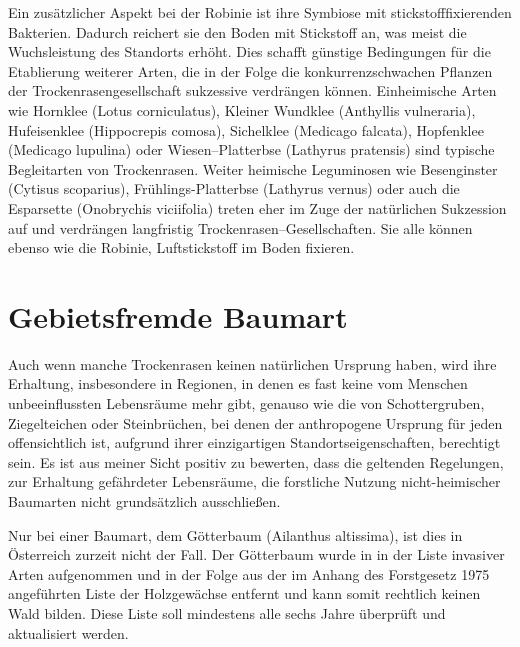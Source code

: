 \documentclass[twocolumn]{scrartcl}
\begin{document}
Ein zusätzlicher Aspekt bei der Robinie ist ihre Symbiose mit
stickstofffixierenden Bakterien. Dadurch reichert sie den Boden mit Stickstoff
an, was meist die Wuchsleistung des Standorts erhöht. Dies schafft günstige
Bedingungen für die Etablierung weiterer Arten, die in der Folge die
konkurrenzschwachen Pflanzen der Trockenrasengesellschaft sukzessive verdrängen
können. Einheimische Arten wie Hornklee (Lotus corniculatus), Kleiner Wundklee
(Anthyllis vulneraria), Hufeisenklee (Hippocrepis comosa), Sichelklee (Medicago
falcata), Hopfenklee (Medicago lupulina) oder Wiesen--Platterbse (Lathyrus
pratensis) sind typische Begleitarten von Trockenrasen.
Weiter heimische Leguminosen wie Besenginster (Cytisus scoparius),
Frühlings-Platterbse (Lathyrus vernus) oder auch die Esparsette (Onobrychis
viciifolia) treten eher im Zuge der natürlichen Sukzession auf und verdrängen
langfristig Trockenrasen--Gesellschaften. Sie alle können ebenso wie die
Robinie, Luftstickstoff im Boden fixieren.

\section{Gebietsfremde Baumart}

Auch wenn manche Trockenrasen keinen natürlichen Ursprung haben, wird
ihre Erhaltung, insbesondere in Regionen, in denen es fast keine vom
Menschen unbeeinflussten Lebensräume mehr gibt, genauso wie die von
Schottergruben, Ziegelteichen oder Steinbrüchen, bei denen der
anthropogene Ursprung für jeden offensichtlich ist, aufgrund ihrer
einzigartigen Standortseigenschaften, berechtigt sein.  Es ist aus
meiner Sicht positiv zu bewerten, dass die geltenden Regelungen, zur
Erhaltung gefährdeter Lebensräume, die forstliche Nutzung
nicht-heimischer Baumarten nicht grundsätzlich ausschließen.

Nur bei einer Baumart, dem Götterbaum (Ailanthus
altissima), ist dies in Österreich zurzeit nicht der Fall. Der Götterbaum wurde
in in der Liste invasiver Arten aufgenommen
\citep{eu2019verordnungListeInvasiverArten,eu2014verordnungInvasiverArten} und
in der Folge aus der im Anhang des Forstgesetz 1975 angeführten Liste der
Holzgewächse entfernt und kann somit rechtlich keinen Wald bilden. Diese Liste
soll mindestens alle sechs Jahre überprüft und aktualisiert werden.
\end{document}
